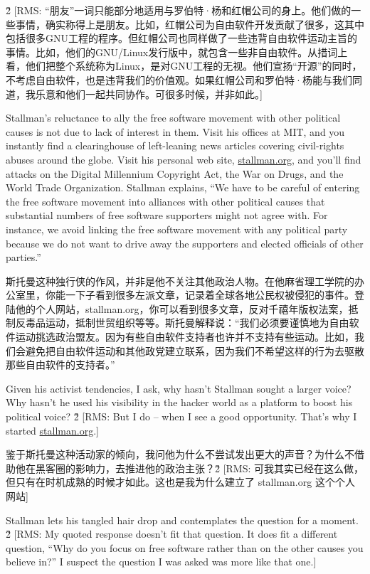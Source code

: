 \ifdefined\chs
\ifdefined\v2
[RMS:
``朋友''一词只能部分地适用与罗伯特·杨和红帽公司的身上。他们做的一些事情，确实称得上是朋友。比如，红帽公司为自由软件开发贡献了很多，这其中包括很多GNU工程的程序。但红帽公司也同样做了一些违背自由软件运动主旨的事情。比如，他们的GNU/Linux发行版中，就包含一些非自由软件。从措词上看，他们把整个系统称为Linux，是对GNU工程的无视。他们宣扬``开源''的同时，不考虑自由软件，也是违背我们的价值观。如果红帽公司和罗伯特·杨能与我们同道，我乐意和他们一起共同协作。可很多时候，并非如此。]
\fi
\fi

\ifdefined\eng
Stallman's reluctance to ally the free software movement with other political causes is not due to lack of interest in them.  Visit his offices at MIT, and you instantly find a clearinghouse of left-leaning news articles covering civil-rights abuses around the globe. Visit his personal web site, \url{stallman.org}, and you'll find attacks on the Digital Millennium Copyright Act, the War on Drugs, and the World Trade Organization.  Stallman explains, ``We have to be careful of entering the free software movement into alliances with other political causes that substantial numbers of free software supporters might not agree with.  For instance, we avoid linking the free software movement with any political party because we do not want to drive away the supporters and elected officials of other parties.''
\fi

\ifdefined\chs
斯托曼这种独行侠的作风，并非是他不关注其他政治人物。在他麻省理工学院的办公室里，你能一下子看到很多左派文章，记录着全球各地公民权被侵犯的事件。登陆他的个人网站，stallman.org，你可以看到很多文章，反对千禧年版权法案，抵制反毒品运动，抵制世贸组织等等。斯托曼解释说：``我们必须要谨慎地为自由软件运动挑选政治盟友。因为有些自由软件支持者也许并不支持有些运动。比如，我们会避免把自由软件运动和其他政党建立联系，因为我们不希望这样的行为去驱散那些自由软件的支持者。''
\fi

\ifdefined\eng
Given his activist tendencies, I ask, why hasn't Stallman sought a larger voice? Why hasn't he used his visibility in the hacker world as a platform to boost his political voice?  \ifdefined\v2 [RMS: But I do -- when I see a good opportunity.  That's why I started \url{stallman.org}.]\if
\fi

\ifdefined\chs
鉴于斯托曼这种活动家的倾向，我问他为什么不尝试发出更大的声音？为什么不借助他在黑客圈的影响力，去推进他的政治主张？\ifdefined\v2 [RMS: 可我其实已经在这么做，但只有在时机成熟的时候才如此。这也是我为什么建立了 stallman.org 这个个人网站] \fi
\fi

\ifdefined\eng
Stallman lets his tangled hair drop and contemplates the question for a moment. \ifdefined\v2 [RMS:  My quoted response doesn't fit that question.  It does fit a different question, ``Why do you focus on free software rather than on the other causes you believe in?''  I suspect the question I was asked was more like that one.] \fi
\fi

